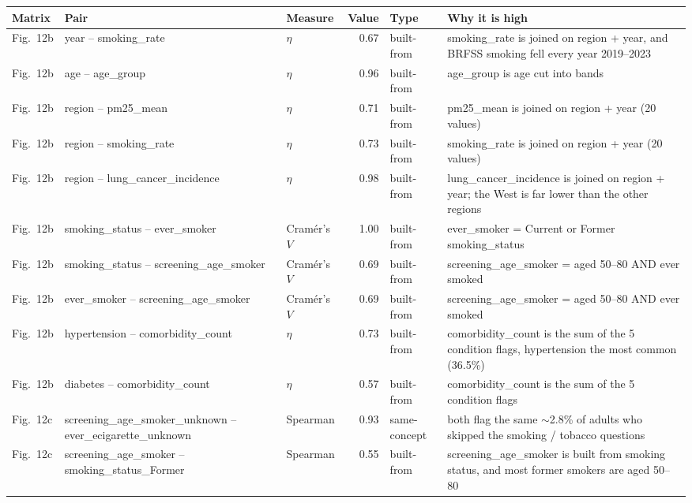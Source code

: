 \begin{tabularx}{\textwidth}{l >{\raggedright\arraybackslash}p{4.2cm} l r l >{\raggedright\arraybackslash}X}
\toprule
Matrix & Pair & Measure & Value & Type & Why it is high \\
\midrule
Fig.~12b & year -- smoking\_\allowbreak{}rate & $\eta$ & 0.67 & built-from & smoking\_rate is joined on region + year, and BRFSS smoking fell every year 2019--2023 \\
Fig.~12b & age -- age\_\allowbreak{}group & $\eta$ & 0.96 & built-from & age\_group is age cut into bands \\
Fig.~12b & region -- pm25\_\allowbreak{}mean & $\eta$ & 0.71 & built-from & pm25\_mean is joined on region + year (20 values) \\
Fig.~12b & region -- smoking\_\allowbreak{}rate & $\eta$ & 0.73 & built-from & smoking\_rate is joined on region + year (20 values) \\
Fig.~12b & region -- lung\_\allowbreak{}cancer\_\allowbreak{}incidence & $\eta$ & 0.98 & built-from & lung\_cancer\_incidence is joined on region + year; the West is far lower than the other regions \\
Fig.~12b & smoking\_\allowbreak{}status -- ever\_\allowbreak{}smoker & Cram\'er's $V$ & 1.00 & built-from & ever\_smoker = Current or Former smoking\_status \\
Fig.~12b & smoking\_\allowbreak{}status -- screening\_\allowbreak{}age\_\allowbreak{}smoker & Cram\'er's $V$ & 0.69 & built-from & screening\_age\_smoker = aged 50--80 AND ever smoked \\
Fig.~12b & ever\_\allowbreak{}smoker -- screening\_\allowbreak{}age\_\allowbreak{}smoker & Cram\'er's $V$ & 0.69 & built-from & screening\_age\_smoker = aged 50--80 AND ever smoked \\
Fig.~12b & hypertension -- comorbidity\_\allowbreak{}count & $\eta$ & 0.73 & built-from & comorbidity\_count is the sum of the 5 condition flags, hypertension the most common (36.5\%) \\
Fig.~12b & diabetes -- comorbidity\_\allowbreak{}count & $\eta$ & 0.57 & built-from & comorbidity\_count is the sum of the 5 condition flags \\
Fig.~12c & screening\_\allowbreak{}age\_\allowbreak{}smoker\_\allowbreak{}unknown -- ever\_\allowbreak{}ecigarette\_\allowbreak{}unknown & Spearman & 0.93 & same-concept & both flag the same $\sim$2.8\% of adults who skipped the smoking / tobacco questions \\
Fig.~12c & screening\_\allowbreak{}age\_\allowbreak{}smoker -- smoking\_\allowbreak{}status\_\allowbreak{}Former & Spearman & 0.55 & built-from & screening\_age\_smoker is built from smoking status, and most former smokers are aged 50--80 \\
\bottomrule
\end{tabularx}
